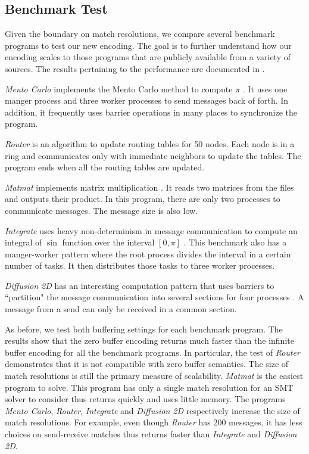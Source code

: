 \subsection{Benchmark Test}
Given the boundary on match resolutions, we compare several benchmark programs to test our new encoding. The goal is to further understand how our encoding scales to those programs that are publicly available from a variety of sources. The results pertaining to the performance are documented in . 

\begin{compactitem}

\item \textit{Mento Carlo} implements the Mento Carlo method to compute $\pi$ \cite{benchmark:mentoCarlo}. It uses one manger process and three worker processes to send messages back of forth. In addition, it frequently uses barrier operations in many places to synchronize the program. 
\item \textit{Router} is an algorithm to update routing tables for 50 nodes. Each node is in a ring and communicates only with immediate neighbors to update the tables. The program ends when all the routing tables are updated. 
\item \textit{Matmat} implements matrix multiplication \cite{benchmark:fevs}. It reads two matrices from the files and outputs their product. In this program, there are only two processes to communicate messages. The message size is also low.
\item \textit{Integrate} uses heavy non-determinism in message communication to compute an integral of $\sin$ function over the interval $[0, \pi]$ \cite{benchmark:fevs}. This benchmark also has a manger-worker pattern where the root process divides the interval in a certain number of tasks. It then distributes those tasks to three worker processes. %
\item \textit{Diffusion 2D} has an interesting computation pattern that uses barriers to ``partition" the message communication into several sections for four processes \cite{benchmark:fevs}. A message from a send can only be received in a common section. 
\end{compactitem}

As before, we test both buffering settings for each benchmark program. The results show that the zero buffer encoding returns much faster than the infinite buffer encoding for all the benchmark programs. In particular, the test of \textit{Router} demonstrates that it is not compatible with zero buffer semantics. The size of match resolutions is still the primary measure of scalability. \textit{Matmat} is the easiest program to solve. This program has only a single match resolution for an SMT solver to consider thus returns quickly and uses little memory. The programs \textit{Mento Carlo}, \textit{Router}, \textit{Integrate} and \textit{Diffusion 2D} respectively increase the size of match resolutions. For example, even though \textit{Router} has 200 messages, it has less choices on send-receive matches thus returns faster than \textit{Integrate} and \textit{Diffusion 2D}. 


